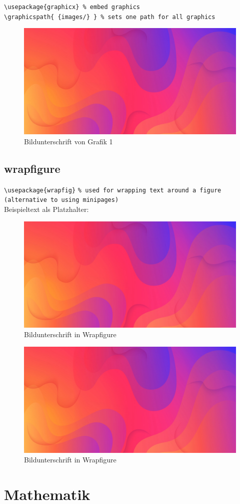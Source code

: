 \documentclass[notitlepage, 11pt, a4paper,ngerman]{article}
\begin{document}
\verb|\usepackage{graphicx} % embed graphics|\\
\verb|\graphicspath{ {images/} } % sets one path for all graphics|\\

\begin{figure}[ht] %
	\centering
	\includegraphics[width=.5\linewidth]{image.png}
	\caption[Bildunterschrift für Verzeichnis]{Bildunterschrift von Grafik 1}
	\label{Bild1}
\end{figure}

\newpage

\subsection{wrapfigure}

\noindent
\verb|\usepackage{wrapfig}| \texttt{\% used for wrapping text around a figure\\ (alternative to using minipages)}\\

\noindent
Beispieltext als Platzhalter:\\
\begin{figure}
	\centering
	\includegraphics[width=.25\textwidth]{image.png}
	\caption[Bildunterschrift im Verzeichnis 2]{Bildunterschrift in Wrapfigure}	
\end{figure}
\lipsum[1]
\begin{figure}
	\centering
	\includegraphics[width=.25\textwidth]{image.png}
	\caption[Bildunterschrift im Verzeichnis 2]{Bildunterschrift in Wrapfigure}	
\end{figure}
\lipsum[2]

\section{Mathematik}
\end{document}
